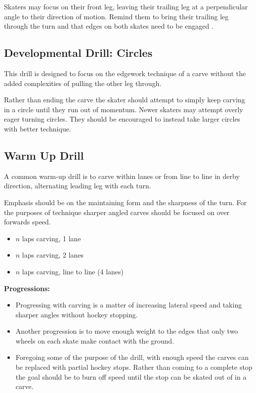 Skaters may focus on their front leg, leaving their trailing leg at a perpendicular angle to their direction of motion.   
Remind them to bring their trailing leg through the turn and that edges on both skates need to be engaged .

 
\subsection*{Developmental Drill: Circles}

This drill is designed to focus on the edgework technique of a carve without the added complexities of pulling the other leg through.

Rather than ending the carve the skater should attempt to simply keep carving in a circle until they run out of momentum. 
Newer skaters may attempt overly eager turning circles.  
They should be encouraged to instead take larger circles with better technique. 


\subsection*{Warm Up Drill}

A common warm-up drill is to carve within lanes or from line to line in derby direction, alternating leading leg with each turn.    

Emphasis should be on the maintaining form and the sharpness of the turn. For the purposes of technique sharper angled carves should be focused on over forwards speed. 

\begin{itemize}
\item $n$ laps carving, 1 lane 
\item $n$ laps carving, 2 lanes
\item $n$ laps carving, line to line (4 lanes)
\end{itemize}


{\bf Progressions:}

\begin{itemize}
    \item Progressing with carving is a matter of increasing lateral speed and taking sharper angles without hockey stopping. 
    \item  Another progression is to move enough weight to the edges that only two wheels on each skate make contact with the ground.
    \item Foregoing some of the purpose of the drill, with enough speed the carves can be replaced with partial hockey stops. Rather than coming to a complete stop the goal should be to burn off speed until the stop can be skated out of in a carve.    
\end{itemize}


